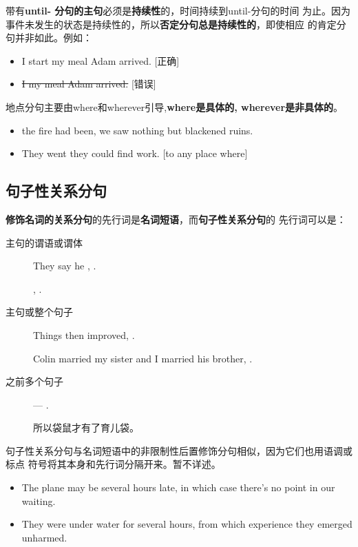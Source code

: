带有\textbf{until- 分句的主句}必须是\textbf{持续性}的，时间持续到until-分句的时间
为止。因为事件未发生的状态是持续性的，所以\textbf{否定分句总是持续性的}，即使相应
的肯定分句并非如此。例如：
\begin{itemize}
\item I  start my meal  Adam arrived. [正确]
\item \sout{I  my meal  Adam arrived.} [错误]
\end{itemize}


地点分句主要由where和wherever引导,\textbf{where是具体的, wherever是非具体的}。
\begin{itemize}
\item {} the fire had been, we saw nothing but blackened ruins.

\item They went  they could find work. [to any place where]
\end{itemize}



\subsection{句子性关系分句}

\textbf{修饰名词的关系分句}的先行词是\textbf{名词短语}，而\textbf{句子性关系分句}的
先行词可以是：
\begin{description}
\item[主句的谓语或谓体] They say he , .

  , .

\item[主句或整个句子] Things then improved, .

  Colin married my sister and I married his brother, .

\item[之前多个句子] --- .

  所以袋鼠才有了育儿袋。

\end{description}

句子性关系分句与名词短语中的非限制性后置修饰分句相似，因为它们也用语调或标点
符号将其本身和先行词分隔开来。暂不详述。
\begin{itemize}
\item The plane may be several hours late, in which case there's no point in our waiting.

\item They were under water for several hours, from which experience they
  emerged unharmed.
\end{itemize}

